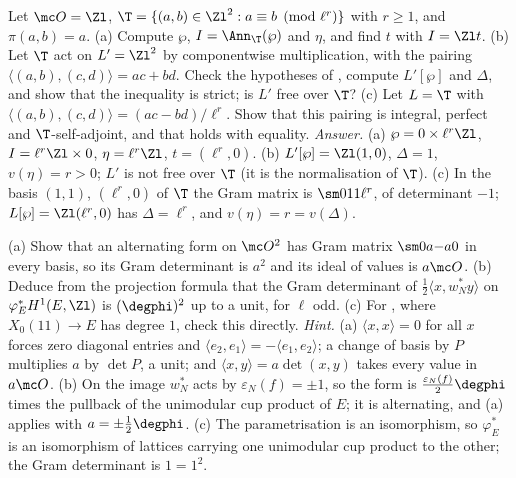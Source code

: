 \begin{sloppypar}
\begin{exercise}\label{ex:paper:ddt-toy}
Let $\mc O=\Zl$, $\T=\{(a,b)\in\Zl^2:a\equiv b\pmod{\ell^r}\}$ with $r\ge1$, and $\pi(a,b)=a$. (a) Compute $\wp$, $I=\Ann_\T(\wp)$ and $\eta$, and find $t$ with $I=\Zl t$. (b) Let $\T$ act on $L'=\Zl^2$ by componentwise
multiplication, with the pairing $\langle(a,b),(c,d)\rangle=ac+bd$. Check the hypotheses of , compute $L'[\wp]$ and $\Delta$, and show that the inequality is strict; is $L'$ free over $\T$?
(c) Let $L=\T$ with $\langle(a,b),(c,d)\rangle=(ac-bd)/\ell^r$. Show that this pairing is integral, perfect and $\T$-self-adjoint, and that  holds with equality.
\emph{Answer.} (a) $\wp=0\times\ell^r\Zl$, $I=\ell^r\Zl\times0$, $\eta=\ell^r\Zl$, $t=(\ell^r,0)$. (b) $L'[\wp]=\Zl(1,0)$, $\Delta=1$, $v(\eta)=r>0$; $L'$ is not free over $\T$ (it is the normalisation of $\T$). (c) In the
basis $(1,1)$, $(\ell^r,0)$ of $\T$ the Gram matrix is $\sm011{\ell^r}$, of determinant $-1$; $L[\wp]=\Zl(\ell^r,0)$ has $\Delta=\ell^r$, and $v(\eta)=r=v(\Delta)$.
\end{exercise}

\begin{exercise}\label{ex:paper:gram}
(a) Show that an alternating form on $\mc O^2$ has Gram matrix $\sm0a{-a}0$ in every basis, so its Gram determinant is $a^2$ and its ideal of values is $a\mc O$. (b) Deduce from the projection formula
that the Gram determinant of $\frac12\langle x,w_N^*y\rangle$ on $\varphi_E^*H^1(E,\Zl)$ is $(\degphi)^2$ up to a unit, for $\ell$ odd. (c) For , where $X_0(11)\to E$ has degree $1$, check this directly.
\emph{Hint.} (a) $\langle x,x\rangle=0$ for all $x$ forces zero diagonal entries and $\langle e_2,e_1\rangle=-\langle e_1,e_2\rangle$; a change of basis by $P$ multiplies $a$ by $\det P$, a unit; and
$\langle x,y\rangle=a\det(x,y)$ takes every value in $a\mc O$. (b) On the image $w_N^*$ acts by $\varepsilon_N(f)=\pm1$, so the form is $\frac{\varepsilon_N(f)}2\degphi$ times the pullback of the
unimodular cup product of $E$; it is alternating, and (a) applies with $a=\pm\frac12\degphi$. (c) The parametrisation is an isomorphism, so $\varphi_E^*$ is an isomorphism of lattices carrying one
unimodular cup product to the other; the Gram determinant is $1=1^2$.
\end{exercise}


\end{sloppypar}

